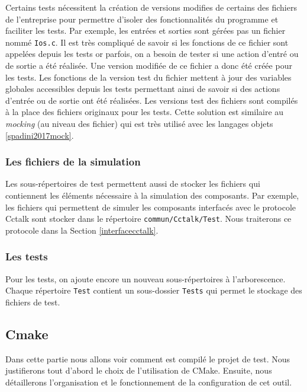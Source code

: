 \documentclass[a4paper]{article}
\begin{document}
Certains tests nécessitent la création de versions modifies de certains des
fichiers de l'entreprise pour permettre d'isoler des fonctionnalités du
programme et faciliter les tests. Par exemple, les entrées et sorties sont
gérées pas un fichier nommé \verb|Ios.c|. Il est très compliqué de savoir si les
fonctions de ce fichier sont appelées depuis les tests or parfois, on a besoin
de tester si une action d'entré ou de sortie a été réalisée. Une version modifiée
de ce fichier a donc été créée pour les tests. Les fonctions de la version test
du fichier mettent à jour des variables globales accessibles depuis les tests
permettant ainsi de savoir si des actions d'entrée ou de sortie ont été
réalisées. Les versions test des fichiers sont compilés à la place des fichiers
originaux pour les tests. Cette solution est similaire au \textit{mocking} (au
niveau des fichier) qui est très utilisé avec les langages objets
\ref{spadini2017mock}.

\subsubsection{Les fichiers de la simulation}

Les sous-répertoires de test permettent aussi de stocker les fichiers qui
contiennent les éléments nécessaire à la simulation des composants. Par exemple,
les fichiers qui permettent de simuler les composants interfacés avec le
protocole Cctalk sont stocker dans le répertoire \verb|commun/Cctalk/Test|. Nous
traiterons ce protocole dans la Section \ref{interfacecctalk}.

\subsubsection{Les tests}

Pour les tests, on ajoute encore un nouveau sous-répertoires à l'arborescence.
Chaque répertoire \verb|Test| contient un sous-dossier \verb|Tests| qui permet le
stockage des fichiers de test.

\subsection{Cmake}
\label{cmake}

Dans cette partie nous allons voir comment est compilé le projet de test. Nous
justifierons tout d'abord le choix de l'utilisation de CMake. Ensuite, nous
détaillerons l'organisation et le fonctionnement de la configuration de cet
outil.
\end{document}
